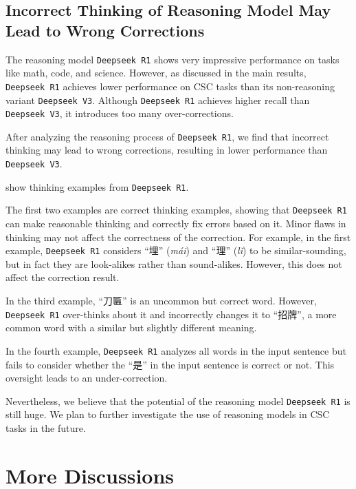 \subsection{Incorrect Thinking of Reasoning Model May Lead to Wrong Corrections}
\label{subsec:incorrect_thinking_may_lead_to_wrong_corrections}

The reasoning model \texttt{Deepseek\,R1} \cite{deepseek-r1-2025} shows very impressive performance on tasks like math, code, and science.
However, as discussed in the main results, \texttt{Deepseek\,R1} achieves lower performance on CSC tasks than its non-reasoning variant \texttt{Deepseek\,V3}.
Although \texttt{Deepseek\,R1} achieves higher recall than \texttt{Deepseek\,V3}, it introduces too many over-corrections.

After analyzing the reasoning process of \texttt{Deepseek\,R1}, we find that incorrect thinking may lead to wrong corrections, resulting in lower performance than \texttt{Deepseek\,V3}.

 show thinking examples from \texttt{Deepseek\,R1}.

The first two examples are correct thinking examples, showing that \texttt{Deepseek\,R1} can make reasonable thinking and correctly fix errors based on it.
Minor flaws in thinking may not affect the correctness of the correction.
For example, in the first example, \texttt{Deepseek\,R1} considers ``埋'' (\textit{mái}) and ``理'' (\textit{lǐ}) to be similar-sounding, but in fact they are look-alikes rather than sound-alikes.
However, this does not affect the correction result.

In the third example, ``刀匾'' is an uncommon but correct word.
However, \texttt{Deepseek\,R1} over-thinks about it and incorrectly changes it to ``招牌'', a more common word with a similar but slightly different meaning.

In the fourth example, \texttt{Deepseek\,R1} analyzes all words in the input sentence but fails to consider whether the ``是'' in the input sentence is correct or not.
This oversight leads to an under-correction.

Nevertheless, we believe that the potential of the reasoning model \texttt{Deepseek\,R1} is still huge.
We plan to further investigate the use of reasoning models in CSC tasks in the future.

\section{More Discussions}
\label{app:more_discussion}

